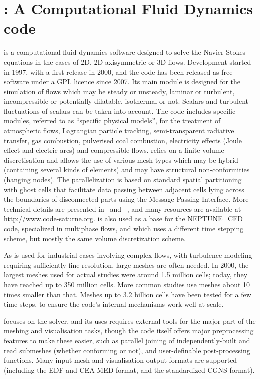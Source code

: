 \section{\CS: A Computational Fluid Dynamics code}
\label{sec:cs}
\CS is a computational fluid dynamics software designed to solve the
Navier-Stokes equations in the cases of 2D, 2D axisymmetric or 3D
flows. Development started in 1997, with a first release in 2000, and the
code has been released as free software under a GPL licence since 2007.
Its main module is designed for the simulation of flows which may be
steady or unsteady, laminar or turbulent, incompressible or potentially
dilatable, isothermal or not. Scalars and turbulent fluctuations of scalars can
be taken into account. The code includes specific modules, referred to as
``specific physical models'', for the treatment of atmospheric flows, Lagrangian particle
tracking, semi-transparent radiative transfer, gas combustion, pulverised coal
combustion, electricity effects (Joule effect and electric arcs) and
compressible flows. \CS relies on a finite volume discretisation and
allows the use of various mesh types which may be hybrid (containing several
kinds of elements) and may have structural non-conformities (hanging nodes). The
parallelization is based on standard spatial partitioning with ghost cells
that facilitate data passing between adjacent cells lying across the boundaries
of disconnected parts using the Message Passing Interface. More
technical details are presented in~\cite{cs2004} and ~\cite{userguide},
and many resources are available at \url{http://www.code-saturne.org}.
\CS is also used as a base for the NEPTUNE\_CFD code, specialized in
multiphase flows, and which uses a different time stepping scheme,
but mostly the same volume discretization scheme.

As \CS is used for industrial cases involving complex flows, with turbulence
modeling requiring sufficiently fine resolution, large meshes are often
needed. In 2000, the largest meshes used for actual studies were around
1.5 million cells; today, they have reached up to 350 million cells.
More common studies use meshes about 10 times smaller than that.
Meshes up to 3.2 billion cells have been tested for a few time steps, to
ensure the code's internal mechanisms work well at scale.

\CS focuses on the solver, and its uses requires external tools for the
major part of the meshing and visualisation tasks, though the code itself offers
major preprocessing features to make these easier, such as parallel joining
of independently-built and read submeshes (whether conforming or not),
and user-definable post-processing functions. Many input mesh and visualisation
output formats are supported (including the EDF and CEA MED format,
and the standardized CGNS format).

